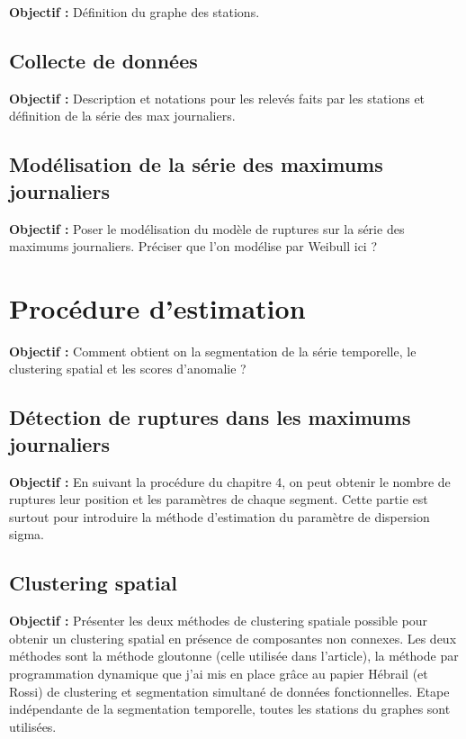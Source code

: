 \documentclass[12pt, twoside]{report}
\begin{document}
\textbf{Objectif :} Définition du graphe des stations.

\subsection{Collecte de données}

\textbf{Objectif :} Description et notations pour les relevés faits par les stations et définition de la série des max journaliers.

\subsection{Modélisation de la série des maximums journaliers}

\textbf{Objectif :} Poser le modélisation du modèle de ruptures sur la série des maximums journaliers. Préciser que l'on modélise par Weibull ici ? 

\section{Procédure d'estimation}

\textbf{Objectif :} Comment obtient on la segmentation de la série temporelle, le clustering spatial et les scores d'anomalie ? 

\subsection{Détection de ruptures dans les maximums journaliers}

\textbf{Objectif :} En suivant la procédure du chapitre 4, on peut obtenir le nombre de ruptures leur position et les paramètres de chaque segment. Cette partie est surtout pour introduire la méthode d'estimation du paramètre de dispersion sigma. 

\subsection{Clustering spatial}

\textbf{Objectif :} Présenter les deux méthodes de clustering spatiale possible pour obtenir un clustering spatial en présence de composantes non connexes. Les deux méthodes sont la méthode gloutonne (celle utilisée dans l'article), la méthode par programmation dynamique que j'ai mis en place grâce au papier Hébrail (et Rossi) de clustering et segmentation simultané de données fonctionnelles. Etape indépendante de la segmentation temporelle, toutes les stations du graphes sont utilisées. 
\end{document}

